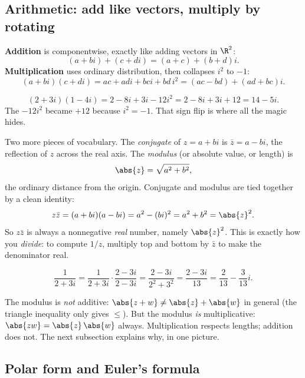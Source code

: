 \subsection{Arithmetic: add like vectors, multiply by rotating}
\label{ch39:complex-arith}

\textbf{Addition} is componentwise, exactly like adding vectors in $\R^2$:
\[
(a+bi) + (c+di) = (a+c) + (b+d)i.
\]
\textbf{Multiplication} uses ordinary distribution, then collapses $i^2$ to $-1$:
\[
(a+bi)(c+di) = ac + adi + bci + bd\,i^2 = (ac - bd) + (ad + bc)i.
\]

\begin{example}
\label{ch39:ex-mult}
\[
(2 + 3i)(1 - 4i) = 2 - 8i + 3i - 12 i^2 = 2 - 8i + 3i + 12 = 14 - 5i.
\]
The $-12 i^2$ became $+12$ because $i^2 = -1$. That sign flip is where all the magic hides.
\end{example}

Two more pieces of vocabulary. The \emph{conjugate} of $z = a + bi$ is $\bar z = a - bi$, the
reflection of $z$ across the real axis. The \emph{modulus} (or absolute value, or length) is
\[
\abs{z} = \sqrt{a^2 + b^2},
\]
the ordinary distance from the origin. Conjugate and modulus are tied together by a clean identity:
\[
z\bar z = (a+bi)(a-bi) = a^2 - (bi)^2 = a^2 + b^2 = \abs{z}^2.
\]
So $z\bar z$ is always a nonnegative \emph{real} number, namely $\abs{z}^2$. This is exactly how you
\emph{divide}: to compute $1/z$, multiply top and bottom by $\bar z$ to make the denominator real.

\begin{example}
\label{ch39:ex-div}
\[
\frac{1}{2+3i} = \frac{1}{2+3i}\cdot\frac{2-3i}{2-3i}
= \frac{2-3i}{2^2+3^2} = \frac{2-3i}{13} = \frac{2}{13} - \frac{3}{13}i.
\]
\end{example}

\begin{trapbox}
The modulus is \emph{not} additive: $\abs{z+w} \ne \abs{z} + \abs{w}$ in general (the triangle
inequality only gives $\le$). But the modulus \emph{is} multiplicative: $\abs{zw} = \abs{z}\,\abs{w}$
always. Multiplication respects lengths; addition does not. The next subsection explains why, in one
picture.
\end{trapbox}

\subsection{Polar form and Euler's formula}
\label{ch39:euler}

